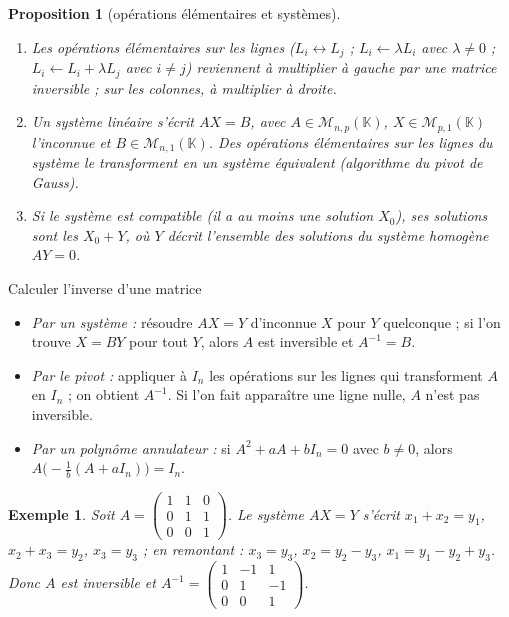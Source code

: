 \documentclass[a4paper,11pt]{article}
\numberwithin{equation}{section}
\numberwithin{figure}{section}
\numberwithin{table}{section}
\theoremstyle{enonce}
\newtheorem{proposition}[definition]{Proposition}
\theoremstyle{exemple}
\newtheorem{exemple}[definition]{Exemple}
\theoremstyle{remarque}
\newcommand{\K}{\mathbb{K}}
\begin{document}
\begin{proposition}[opérations élémentaires et systèmes]\label{r:systemes}
\begin{enumerate}
\item Les opérations élémentaires sur les lignes ($L_i\leftrightarrow L_j$ ; $L_i\leftarrow\lambda L_i$ avec $\lambda\neq0$ ;
$L_i\leftarrow L_i+\lambda L_j$ avec $i\neq j$) reviennent à multiplier \emph{à gauche} par une matrice inversible ; sur les
colonnes, à multiplier \emph{à droite}.
\item Un système linéaire s'écrit $AX=B$, avec $A\in\mathcal M_{n,p}(\K)$, $X\in\mathcal M_{p,1}(\K)$ l'inconnue et
$B\in\mathcal M_{n,1}(\K)$. Des opérations élémentaires sur les lignes du système le transforment en un système
\emph{équivalent} (algorithme du pivot de Gauss).
\item Si le système est \emph{compatible} (il a au moins une solution $X_0$), ses solutions sont les $X_0+Y$, où $Y$ décrit
l'ensemble des solutions du système homogène $AY=0$.
\end{enumerate}
\end{proposition}

\begin{methode}{Calculer l'inverse d'une matrice}\label{m:inverse}
\begin{itemize}
\item \emph{Par un système :} résoudre $AX=Y$ d'inconnue $X$ pour $Y$ quelconque ; si l'on trouve $X=BY$ pour tout $Y$, alors
$A$ est inversible et $A^{-1}=B$.
\item \emph{Par le pivot :} appliquer à $I_n$ les opérations sur les lignes qui transforment $A$ en $I_n$ ; on obtient $A^{-1}$.
Si l'on fait apparaître une ligne nulle, $A$ n'est pas inversible.
\item \emph{Par un polynôme annulateur :} si $A^2+aA+bI_n=0$ avec $b\neq0$, alors $A\big(-\tfrac1b(A+aI_n)\big)=I_n$.
\end{itemize}
\end{methode}

\begin{exemple}
Soit $A=\begin{pmatrix}1&1&0\\0&1&1\\0&0&1\end{pmatrix}$. Le système $AX=Y$ s'écrit $x_1+x_2=y_1$, $x_2+x_3=y_2$, $x_3=y_3$ ; en
remontant : $x_3=y_3$, $x_2=y_2-y_3$, $x_1=y_1-y_2+y_3$. Donc $A$ est inversible et
$A^{-1}=\begin{pmatrix}1&-1&1\\0&1&-1\\0&0&1\end{pmatrix}$.
\end{exemple}
\end{document}
